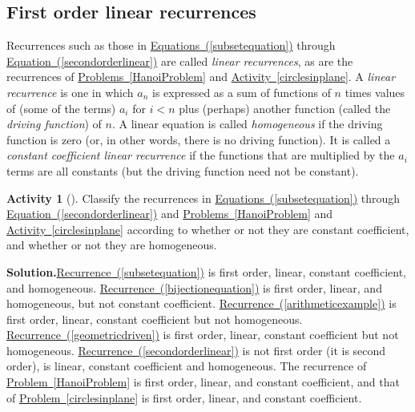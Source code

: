 \documentclass[10pt,]{book}
\theoremstyle{plain}
\theoremstyle{definition}
\newtheorem{activity}[project]{Activity}
\numberwithin{equation}{chapter}
\newcommand{\lt}{<}
\begin{document}
\subsection[{First order linear recurrences}]{First order linear recurrences}\label{subsection-13}
Recurrences such as those in \hyperref[subsetequation]{Equations~(\ref{subsetequation})} through \hyperref[secondorderlinear]{Equation~(\ref{secondorderlinear})} are called \emph{linear recurrences}, as are the recurrences of \hyperref[HanoiProblem]{Problems~\ref{HanoiProblem}} and \hyperref[circlesinplane]{Activity~\ref{circlesinplane}}. A \emph{linear recurrence} is one in which \(a_n\) is expressed as a sum of functions of \(n\) times values of (some of the terms) \(a_i\) for \(i\lt n\) plus (perhaps) another function (called the \emph{driving function}) of \(n\). A linear equation is called \emph{homogeneous} if the driving function is zero (or, in other words, there is no driving function). It is called a \emph{constant coefficient linear recurrence} if the functions that are multiplied by the \(a_i\) terms are all constants (but the driving function need not be constant).%
\begin{activity}[]\label{classifyrecurrences}
Classify the recurrences in \hyperref[subsetequation]{Equations~(\ref{subsetequation})} through \hyperref[secondorderlinear]{Equation~(\ref{secondorderlinear})} and \hyperref[HanoiProblem]{Problems~\ref{HanoiProblem}} and \hyperref[circlesinplane]{Activity~\ref{circlesinplane}} according to whether or not they are constant coefficient, and whether or not they are homogeneous.%
\par\medskip\noindent%
\textbf{Solution.}\quad \hyperref[subsetequation]{Recurrence~(\ref{subsetequation})} is first order, linear, constant coefficient, and homogeneous. \hyperref[bijectionequation]{Recurrence~(\ref{bijectionequation})} is first order, linear, and homogeneous, but not constant coefficient. \hyperref[arithmeticexample]{Recurrence~(\ref{arithmeticexample})} is first order, linear, constant coefficient but not homogeneous. \hyperref[geometricdriven]{Recurrence~(\ref{geometricdriven})} is first order, linear, constant coefficient but not homogeneous. \hyperref[secondorderlinear]{Recurrence~(\ref{secondorderlinear})} is not first order (it is second order), is linear, constant coefficient and homogeneous. The recurrence of \hyperref[HanoiProblem]{Problem~\ref{HanoiProblem}} is first order, linear, and constant coefficient, and that of \hyperref[circlesinplane]{Problem~\ref{circlesinplane}} is first order, linear, and constant coefficient.%
\end{activity}
\end{document}
